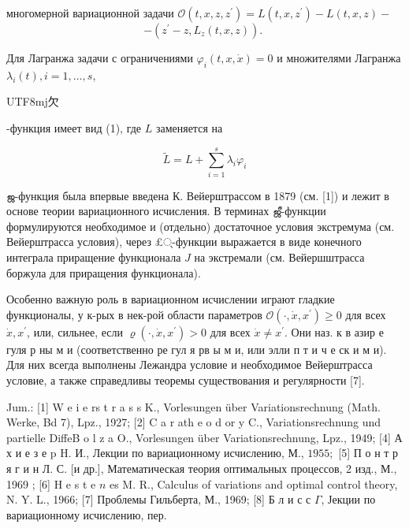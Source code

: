 \documentclass[10pt]{article}
\begin{document}
многомерной вариационной задачи $\mathscr{O}\left(t, x, z, z^{\prime}\right)=L\left(t, x, z^{\prime}\right)-L(t, x, z)-$\[

-\left(z^{\prime}-z, L_{z}(t, x, z)\right) \text {. }

\]



Для Лагранжа задачи с ограничениями $\varphi_{i}(t, x, \dot{x})=0$ и множителями Лагранжа $\lambda_{i}(t), i=1, \ldots, s$, \begin{CJK}{UTF8}{mj}欠\end{CJK}-функция имеет вид (1), где $L$ заменяется на



\[

\tilde{L}=L+\sum_{i=1}^{s} \lambda_{i} \varphi_{i}

\]



ஜ-функция была впервые введена К. Вейерштрассом в 1879 (см. [1]) и лежит в основе теории вариационного исчисления. В терминах ஜீ-функции формулируются необходимое и (отдельно) достаточное условия экстремума (см. Вейерштрасса условия), через £्-функции выражается в виде конечного интеграла приращение функционала $J$ на экстремали (см. Вейершштрасса боржула для приращения функционала).



Особенно важную роль в вариационном исчислении играют гладкие функционалы, у к-рых в нек-рой области параметров $\mathscr{O}\left(\cdot, \dot{x}, x^{\prime}\right) \geqslant 0$ для всех $\dot{x}, x^{\prime}$, или, сильнее, если $\mathscr{\varrho}\left(\cdot, \dot{x}, x^{\prime}\right)>0$ для всех $\dot{x} \neq x^{\prime}$. Они наз. к в азир е гуля р ны м и (соответственно ре гул я рв ы м и, или элли п т и ч е ск и м и). Для них всегда выполнены Лежандра условие и необходимое Вейерштрасса условие, а также справедливы теоремы существования и регулярности [7].



Jum.: [1] W e i e rs t r a s s K., Vorlesungen über Variationsrechnung (Math. Werke, Bd 7), Lpz., 1927; [2] C a r ath e o d or y C., Variationsrechnung und partielle DiffeB o l z a O., Vorlesungen über Variationsrechnung, Lpz., 1949; [4] А х и е з е p H. И., Лекции по вариационному исчислению, М., $1955 ;$ [5] П о н т р я г и н Л. С. [и др.], Математическая теория оптимальных процессов, 2 изд., М., 1969 ; [6] H e s t e $n$ es $\mathrm{M}$. R., Calculus of variations and optimal control theory, N. Y. L., 1966; [7] Проблемы Гильберта, М., 1969; [8] Б л и с с $\Gamma$, Јекции по вариационному исчислению, пер.
\end{document}
